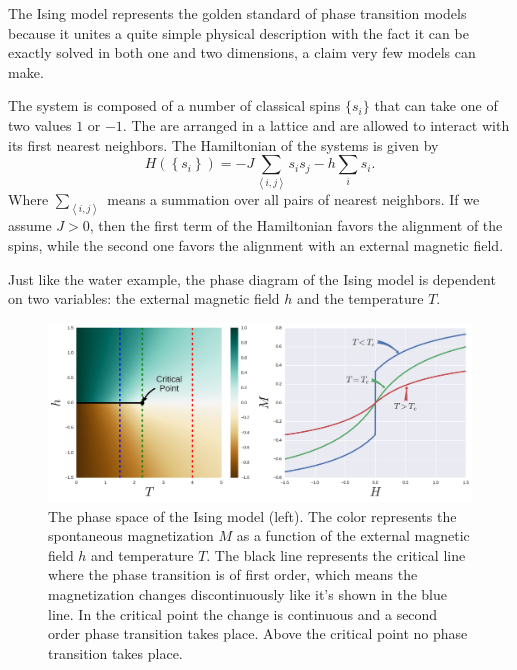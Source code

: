 The Ising model represents the golden standard of phase transition models
because it unites a quite simple physical description with the fact it can be
exactly solved in both one and two dimensions, a claim very few models can
make.

The system is composed of a number of classical spins $\{s_i\}$ that can take
one of two values $1$ or $-1$. The are arranged in a lattice and are allowed to
interact with its first nearest neighbors. The Hamiltonian of the systems is
given by
\begin{equation}
    \label{eq:ising}
    H\left(\left\{s_{i}\right\}\right) = 
        -J\sum_{\left\langle i,j\right\rangle}s_{i}s_{j}
        -h\sum_{i}s_{i}.
\end{equation}
Where $\sum_{\left\langle i,j\right\rangle}$ means a summation over all pairs
of nearest neighbors. If we assume $J>0$, then the first term of the
Hamiltonian favors the alignment of the spins, while the second one 
favors the alignment with an external magnetic field.

Just like the water example, the phase diagram of the Ising model is dependent
on two variables: the external magnetic field $h$ and the temperature $T$.

\begin{figure}
\begin{center}
    \includegraphics[scale=0.4]{chapters/ch2-crit/figs/ising_phase2}
\end{center}
\caption{The phase space of the Ising model (left). The color represents the
    spontaneous magnetization $M$ as a function of the external magnetic field
    $h$ and temperature $T$. The black line represents the critical line where
    the phase transition is of first order, which means the magnetization
    changes discontinuously like it's shown in the blue line. In the critical
    point the change is continuous and a second order phase transition takes
    place. Above the critical point no phase transition takes place.}
\label{fig:ising_phase2}
\end{figure}


